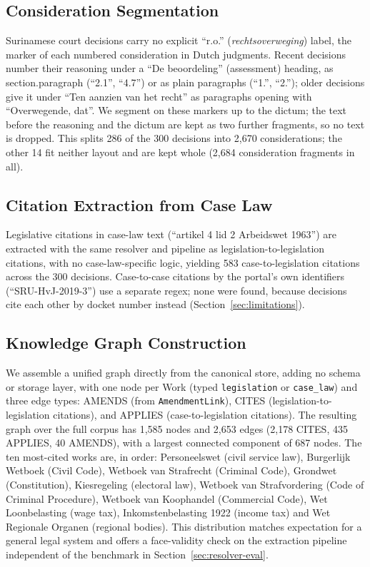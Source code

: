 \documentclass{IOS-Book-Article}
\begin{document}
\subsection{Consideration Segmentation}

Surinamese court decisions carry no explicit ``r.o.'' (\emph{rechtsoverweging}) label, the
marker of each numbered consideration in Dutch judgments. Recent
decisions number their reasoning under a ``De beoordeling'' (assessment) heading, as
section.paragraph (``2.1'', ``4.7'') or as plain paragraphs (``1.'', ``2.''); older decisions
give it under ``Ten aanzien van het recht'' as paragraphs opening with ``Overwegende, dat''.
We segment on these markers up to the dictum; the text before the reasoning and the dictum
are kept as two further fragments, so no text is dropped. This splits 286 of the 300
decisions into 2,670 considerations; the other 14 fit neither layout and are kept whole
(2,684 consideration fragments in all).

\subsection{Citation Extraction from Case Law}

Legislative citations in case-law text (``artikel 4 lid 2 Arbeidswet 1963'') are extracted
with the same resolver and pipeline as legislation-to-legislation citations, with no
case-law-specific logic, yielding 583 case-to-legislation citations across the 300
decisions. Case-to-case citations by the portal's own identifiers (``SRU-HvJ-2019-3'') use a
separate regex; none were found, because decisions cite each other by docket number
instead (Section~\ref{sec:limitations}).

\subsection{Knowledge Graph Construction}

We assemble a unified graph directly from the canonical store, adding no schema or
storage layer, with one node per Work (typed \texttt{legislation} or \texttt{case\_law}) and three edge
types: AMENDS (from \texttt{AmendmentLink}), CITES (legislation-to-legislation citations), and
APPLIES (case-to-legislation citations). The resulting graph over the full corpus has
1,585 nodes and 2,653 edges (2,178 CITES, 435 APPLIES, 40 AMENDS), with a largest connected
component of 687 nodes. The ten most-cited works are, in order: Personeelswet (civil service
law), Burgerlijk Wetboek (Civil Code), Wetboek van Strafrecht (Criminal Code), Grondwet
(Constitution), Kiesregeling (electoral law), Wetboek van Strafvordering (Code of Criminal
Procedure), Wetboek van Koophandel (Commercial Code), Wet Loonbelasting (wage tax),
Inkomstenbelasting 1922 (income tax) and Wet Regionale Organen (regional bodies). This distribution matches expectation for a general legal system and offers a
face-validity check on the extraction pipeline independent of the benchmark in Section~\ref{sec:resolver-eval}.
\end{document}
